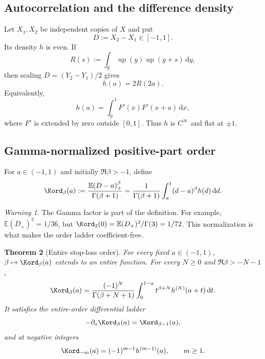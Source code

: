 \documentclass[11pt,oneside]{article}
\newtheorem{theorem}{Theorem}[section]
\theoremstyle{definition}
\theoremstyle{remark}
\newtheorem{warning}[theorem]{Warning}
\newcommand{\Up}{\operatorname{up}}
\newcommand{\E}{\mathbb E}
\newcommand{\R}{\mathbb R}
\newcommand{\dd}{\,\mathrm d}
\newcommand{\1}{\mathbf 1}
\begin{document}
\subsection{Autocorrelation and the difference density}

Let $X_1,X_2$ be independent copies of $X$ and put
\begin{equation}
 D:=X_2-X_1\in[-1,1].
 \label{p11:eq:D-def}
\end{equation}
Its density $h$ is even.  If
\begin{equation}
 R(s):=\int_{\R}\Up(y)\Up(y+s)\dd y,
 \label{p11:eq:up-autocorrelation}
\end{equation}
then scaling $D=(Y_2-Y_1)/2$ gives
\begin{equation}
 h(a)=2R(2a).
 \label{p11:eq:h-R-relation}
\end{equation}
Equivalently,
\begin{equation}
 h(a)=\int_0^1F'(x)F'(x+a)\dd x,
 \label{p11:eq:h-F-density-correlation}
\end{equation}
where $F'$ is extended by zero outside $[0,1]$.  Thus $h$ is $C^\infty$ and
flat at $\pm1$.

\subsection{Gamma-normalized positive-part order}

For $a\in(-1,1)$ and initially $\Re\beta>-1$, define
\begin{equation}
 \Kord_\beta(a)
 :=\frac{\E(D-a)_+^\beta}{\Gamma(\beta+1)}
 =\frac1{\Gamma(\beta+1)}
  \int_a^1(d-a)^\beta h(d)\dd d.
 \label{p11:eq:K-beta-def}
\end{equation}

\begin{warning}
The Gamma factor is part of the definition.  For example,
$\E(D_+)^2=1/36$, but
$\Kord_2(0)=\E(D_+)^2/\Gamma(3)=1/72$.  This normalization is what makes the
order ladder coefficient-free.
\end{warning}

\begin{theorem}[Entire stop-loss order]
\label{p11:thm:K-entire}
For every fixed $a\in(-1,1)$, $\beta\mapsto\Kord_\beta(a)$ extends to an
entire function.  For every $N\ge0$ and $\Re\beta>-N-1$,
\begin{equation}
 \Kord_\beta(a)
 =\frac{(-1)^N}{\Gamma(\beta+N+1)}
  \int_0^{1-a}t^{\beta+N}h^{(N)}(a+t)\dd t.
 \label{p11:eq:K-entire-continuation}
\end{equation}
It satisfies the entire-order differential ladder
\begin{equation}
 -\partial_a\Kord_\beta(a)=\Kord_{\beta-1}(a),
 \label{p11:eq:K-order-ladder}
\end{equation}
and at negative integers
\begin{equation}
 \Kord_{-m}(a)=(-1)^{m-1}h^{(m-1)}(a),
 \qquad m\ge1.
 \label{p11:eq:K-negative-orders}
\end{equation}
\end{theorem}
\end{document}
